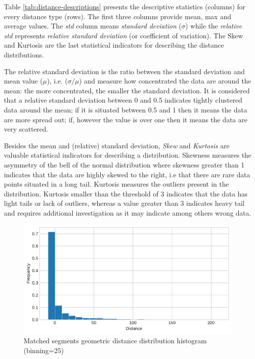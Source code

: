     Table \ref{tab:distance-descriptions} presents the descriptive statistics (columns) for every distance type (rows). The first three columns provide mean, max and average values. The \textit{std} column means \textit{standard deviation} ($\sigma$) while the \textit{relative std} represents \textit{relative standard deviation} (or coefficient of variation). The Skew and Kurtosis are the last statistical indicators for describing the distance distributions.
    
    The relative standard deviation is the ratio between the standard deviation and mean value ($\mu$), i.e. ($\sigma/\mu$) and measure how concentrated the data are around the mean: the more concentrated, the smaller the standard deviation. It is considered that a relative standard deviation between 0 and 0.5 indicates tightly clustered data around the mean; if it is situated between 0.5 and 1 then it means the data are more spread out; if, however the value is over one then it means the data are very scattered. 
    
    Besides the mean and (relative) standard deviation, \textit{Skew} and \textit{Kurtosis} are valuable statistical indicators for describing a distribution. Skewness measures the asymmetry of the bell of the normal distribution where skewness greater than 1 indicates that the data are highly skewed to the right, i.e that there are rare data points situated in a long tail. Kurtosis measures the outliers present in the distribution. Kurtosis smaller than the threshold of 3 indicates that the data has light tails or lack of outliers, whereas a value greater than 3 indicates heavy tail and requires additional investigation as it may indicate among others wrong data. 

    \begin{figure}[!ht]
    \centering
    \includegraphics[width=.85\textwidth]{evaluation-results/figures/distance-distribution-histogram-Geometric-25.pdf}
    \caption{Matched segments geometric distance distribution histogram (binning=25)}
    \label{fig:distance-distribution-histogram-Geometric-25}
    \end{figure}

